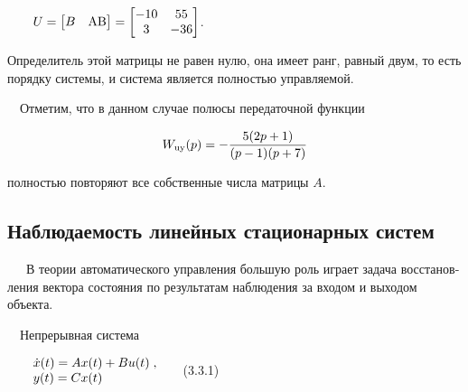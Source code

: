 \documentclass[a4paper]{article}
\newcommand\normalsubformula[1]{\text{\mathversion{normal}$#1$}}
\begin{document}
{\begin{russian}\sffamily
\ \ \ \ 
$U=\left[\begin{matrix}B&\normalsubformula{\text{AB}}\end{matrix}\right]=\left[\begin{matrix}-10&55\\3&-36\end{matrix}\right]$.
\end{russian}}

{\begin{russian}\sffamily
Определитель этой матрицы не равен нулю, она имеет ранг, равный двум, то есть порядку системы, и система является
полностью управляемой. 
\end{russian}}

{\begin{russian}\sffamily
\ \ Отметим, что в данном случае полюсы передаточной функции
\end{russian}}

\begin{equation*}
W_{\normalsubformula{\text{uy}}}(p)=-\frac{5(2p+1)}{(p-1)(p+7)}
\end{equation*}
{\begin{russian}\sffamily
полностью повторяют все собственные числа матрицы  $A$.
\end{russian}}


\bigskip


\bigskip

\subsection{Наблюдаемость линейных стационарных систем}
\hypertarget{RefHeadingToc455659733}{}
\bigskip

{\begin{russian}\sffamily
\ \ \ В теории автоматического управления большую роль играет задача восстановления вектора состояния по результатам
наблюдения за входом и выходом объекта.
\end{russian}}

{\begin{russian}\sffamily
\ \ Непрерывная система
\end{russian}}

{\begin{russian}\sffamily
\ \ \ \  $\begin{matrix}\dot x(t)=Ax(t)+Bu(t)\;,\hfill\null \\y(t)=Cx(t)\hfill\null \end{matrix}\hfill $ \ \ \ (3.3.1)
\end{russian}}
\end{document}
